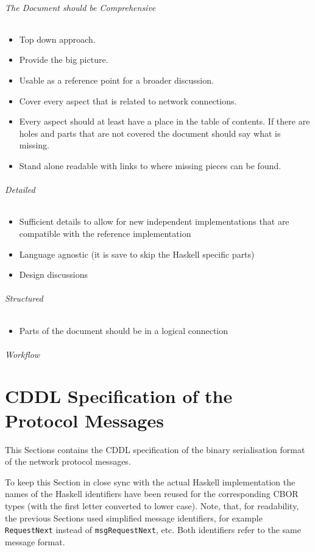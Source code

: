 \documentclass{report}
\newcommand{\hsref}[1]{}
\newcommand{\hsref}[1]
                    {\href{https://github.com/input-output-hk/ouroboros-network/blob/master/#1}
                      {\emph{Haskell source: #1}}}
\theoremstyle{definition}{
  \newtheorem{lemma}{Lemma}[section] %
  \newtheorem{definition}[lemma]{Definition}
}
\theoremstyle{theorem}{
  \newtheorem{invariant}[lemma]{Invariant}
  \newtheorem{proofobligation}[lemma]{Proof Obligation}
}
\numberwithin{equation}{lemma}
\begin{document}
{\subparagraph{The Document should be Comprehensive}
\begin{itemize}
\item Top down approach.
\item Provide the big picture.
\item Usable as a reference point for a broader discussion.
\item Cover every aspect that is related to network connections.
\item Every aspect should at least have a place in the table of contents.
  If there are holes and parts that are not covered the document should say what is missing.
\item Stand alone readable with links to where missing pieces can be found.
\end{itemize}

\subparagraph{Detailed}
\begin{itemize}
\item Sufficient details to allow for new independent implementations that are compatible with
the reference implementation
\item Language agnostic (it is save to skip the Haskell specific parts)
\item Design discussions
\end{itemize}
\subparagraph{Structured}
\begin{itemize}
\item Parts of the document should be in a logical connection
\end{itemize}
\subparagraph{Workflow}
}

\appendix
\chapter{CDDL Specification of the Protocol Messages}
\label{CBOR-section}
\hsref{ouroboros-network/src/Ouroboros/Network/Protocol/PingPong/Codec.hs}
\label{included-cddl}
This Sections contains the CDDL\cite{cddl} specification
of the binary serialisation format of the network protocol messages.

To keep this Section in close sync with the actual Haskell implementation
the names of the Haskell identifiers have been reused for the corresponding
CBOR types (with the first letter converted to lower case).
Note, that, for readability, the previous Sections used simplified message identifiers,
for example {\tt RequestNext} instead of {\tt msgRequestNext}, etc.
Both identifiers refer to the same message format.
\end{document}
